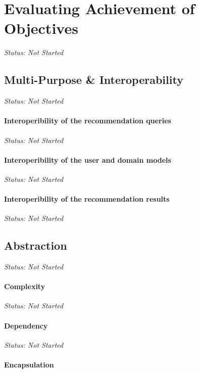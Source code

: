 \chapter{Evaluating Achievement of Objectives}

\emph{Status: Not Started}

\section{Multi-Purpose \& Interoperability}

\emph{Status: Not Started}

\subsubsection{Interoperibility of the recommendation queries}

\emph{Status: Not Started}

\subsubsection{Interoperibility of the user and domain models}

\emph{Status: Not Started}

\subsubsection{Interoperibility of the recommendation results}

\emph{Status: Not Started}

\section{Abstraction}

\emph{Status: Not Started}

\subsubsection{Complexity}

\emph{Status: Not Started}

\subsubsection{Dependency}

\emph{Status: Not Started}

\subsubsection{Encapsulation}

